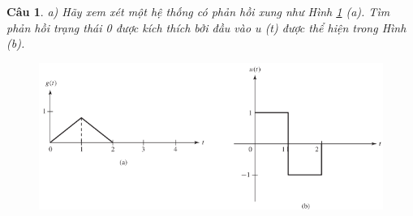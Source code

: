 \documentclass[11pt]{article}
\newtheorem{bt}{Câu}
\begin{document}
\begin{bt}
	a) Hãy xem xét một hệ thống có phản hồi xung như Hình \ref{fig:fig1} (a). Tìm phản hồi trạng thái 0 được kích thích bởi đầu vào u (t) được thể hiện trong Hình (b).
	\begin{figure}[h!]
		\centering
		\includegraphics[width=1.0\linewidth]{Fig2.20}
	    \caption{}
		\label{fig:fig1}
	\end{figure}
	

\end{bt}
\end{document}

